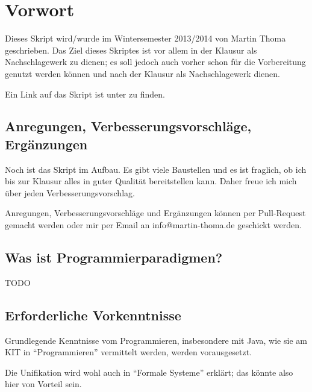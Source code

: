 \chapter*{Vorwort}
Dieses Skript wird/wurde im Wintersemester 2013/2014
von Martin Thoma geschrieben. Das Ziel dieses Skriptes ist vor allem
in der Klausur als Nachschlagewerk zu dienen; es soll jedoch auch
vorher schon für die Vorbereitung genutzt werden können und nach
der Klausur als Nachschlagewerk dienen.

Ein Link auf das Skript ist unter \href{http://martin-thoma.com/programmierparadigmen/}{}
zu finden.

\section*{Anregungen, Verbesserungsvorschläge, Ergänzungen}
Noch ist das Skript im Aufbau. Es gibt viele Baustellen und es ist
fraglich, ob ich bis zur Klausur alles in guter Qualität bereitstellen
kann. Daher freue ich mich über jeden Verbesserungsvorschlag.

Anregungen, Verbesserungsvorschläge und Ergänzungen können per
Pull-Request gemacht werden oder mir per Email an info@martin-thoma.de
geschickt werden.

\section*{Was ist Programmierparadigmen?}

TODO

\section*{Erforderliche Vorkenntnisse}
Grundlegende Kenntnisse vom Programmieren, insbesondere mit Java,
wie sie am KIT in \enquote{Programmieren} vermittelt werden, werden
vorausgesetzt.

Die Unifikation wird wohl auch in \enquote{Formale Systeme}
erklärt; das könnte also hier von Vorteil sein.
